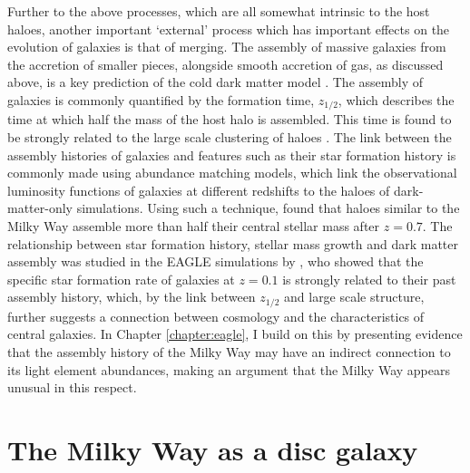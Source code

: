 Further to the above processes, which are all somewhat intrinsic to the host haloes, another important `external' process which has important effects on the evolution of galaxies is that of merging. The assembly of massive galaxies from the accretion of smaller pieces, alongside smooth accretion of gas, as discussed above, is a key prediction of the cold dark matter model \citep[e.g.][]{1974ApJ...187..425P}. The assembly of galaxies is commonly quantified by the formation time, $z_{1/2}$, which describes the time at which half the mass of the host halo is assembled. This time is found to be strongly related to the large scale clustering of haloes \citep[commonly referred to as assembly bias, e.g.][]{2005MNRAS.363L..66G,2007MNRAS.377L...5G}. The link between the assembly histories of galaxies and features such as their star formation history is commonly made using abundance matching models, which link the observational luminosity functions of galaxies at different redshifts to the haloes of dark-matter-only simulations. Using such a technique, \citet{2013MNRAS.428.3121M} found that haloes similar to the Milky Way assemble more than half their central stellar mass after $z=0.7$. The relationship between star formation history, stellar mass growth and dark matter assembly was studied in the EAGLE simulations by \citet{2018arXiv180505956M}, who showed that the specific star formation rate of galaxies at $z=0.1$ is strongly related to their past assembly history, which, by the link between $z_{1/2}$ and large scale structure, further suggests a connection between cosmology and the characteristics of central galaxies. In Chapter \ref{chapter:eagle}, I build on this by presenting evidence that the assembly history of the Milky Way may have an indirect connection to its light element abundances, making an argument that the Milky Way appears unusual in this respect.


\section{The Milky Way as a disc galaxy}
\label{sec:mwadg}

